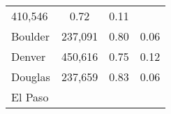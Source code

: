 \documentclass[12pt,twoside]{reedthesis}
\begin{document}
\begin{longtable}[]{@{}lccc@{}}
\begin{minipage}[t]{0.24\columnwidth}
  410,546\strut
  \end{minipage} & \begin{minipage}[t]{0.29\columnwidth}\centering\strut
  0.72\strut
  \end{minipage} & \begin{minipage}[t]{0.25\columnwidth}\centering\strut
  0.11\strut
  \end{minipage}\tabularnewline
  \begin{minipage}[t]{0.10\columnwidth}\raggedright\strut
  Boulder\strut
  \end{minipage} & \begin{minipage}[t]{0.24\columnwidth}\centering\strut
  237,091\strut
  \end{minipage} & \begin{minipage}[t]{0.29\columnwidth}\centering\strut
  0.80\strut
  \end{minipage} & \begin{minipage}[t]{0.25\columnwidth}\centering\strut
  0.06\strut
  \end{minipage}\tabularnewline
  \begin{minipage}[t]{0.10\columnwidth}\raggedright\strut
  Denver\strut
  \end{minipage} & \begin{minipage}[t]{0.24\columnwidth}\centering\strut
  450,616\strut
  \end{minipage} & \begin{minipage}[t]{0.29\columnwidth}\centering\strut
  0.75\strut
  \end{minipage} & \begin{minipage}[t]{0.25\columnwidth}\centering\strut
  0.12\strut
  \end{minipage}\tabularnewline
  \begin{minipage}[t]{0.10\columnwidth}\raggedright\strut
  Douglas\strut
  \end{minipage} & \begin{minipage}[t]{0.24\columnwidth}\centering\strut
  237,659\strut
  \end{minipage} & \begin{minipage}[t]{0.29\columnwidth}\centering\strut
  0.83\strut
  \end{minipage} & \begin{minipage}[t]{0.25\columnwidth}\centering\strut
  0.06\strut
  \end{minipage}\tabularnewline
  \begin{minipage}[t]{0.10\columnwidth}\raggedright\strut
  El Paso\strut
  \end{minipage} & \begin{minipage}[t]{0.24\columnwidth}\centering\strut

\end{minipage}
\end{longtable}
\end{document}
